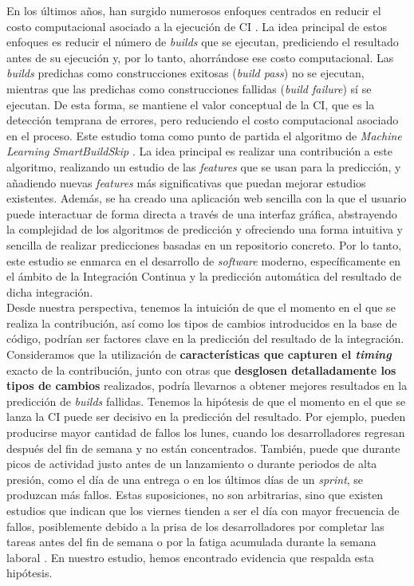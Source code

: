En los últimos años, han surgido numerosos enfoques centrados en reducir el costo computacional
asociado a la ejecución de CI \cite{1,2,4,5,6,7}. La idea principal de estos enfoques es
reducir el número de \textit{builds} que se ejecutan, prediciendo el resultado antes de su
ejecución y, por lo tanto, ahorrándose ese costo computacional. Las \textit{builds} predichas como
construcciones exitosas (\textit{build pass}) no se ejecutan, mientras que las predichas como
construcciones fallidas (\textit{build failure}) sí se ejecutan. De esta forma, se mantiene el
valor conceptual de la CI, que es la detección temprana de errores, pero reduciendo
el costo computacional asociado en el proceso. Este estudio toma como punto de partida el
algoritmo de \textit{Machine Learning} \textit{SmartBuildSkip} \cite{2}. La idea principal es
realizar una contribución a este algoritmo, realizando un estudio de las \textit{features} que
se usan para la predicción, y añadiendo nuevas \textit{features} más significativas que puedan
mejorar estudios existentes. Además, se ha creado una aplicación web sencilla con la que el usuario
puede interactuar de forma directa a través de una interfaz gráfica, abstrayendo la complejidad
de los algoritmos de predicción y ofreciendo una forma intuitiva y sencilla de realizar
predicciones basadas en un repositorio concreto. Por lo tanto, este estudio se enmarca en el
desarrollo de \textit{software} moderno, específicamente en el ámbito de la Integración Continua y
la predicción automática del resultado de dicha integración.\\

Desde nuestra perspectiva, tenemos la intuición de que el momento en el que se realiza la
contribución, así como los tipos de cambios introducidos en la base de código, podrían ser factores
clave en la predicción del resultado de la integración. Consideramos que la utilización de
\textbf{características que capturen el \textit{timing}} exacto de la contribución, junto con
otras que \textbf{desglosen detalladamente los tipos de cambios} realizados, podría llevarnos a
obtener mejores resultados en la predicción de \textit{builds} fallidas. Tenemos la hipótesis de
que el momento en el que se lanza la CI puede ser decisivo en la predicción del resultado. Por
ejemplo, pueden producirse mayor cantidad de fallos los lunes, cuando los desarrolladores regresan
después del fin de semana y no están concentrados. También, puede que durante picos de actividad
justo antes de un lanzamiento o durante periodos de alta presión, como el día de una entrega o en
los últimos días de un \textit{sprint}, se produzcan más fallos. Estas suposiciones, no son
arbitrarias, sino que existen estudios que indican que los viernes tienden a ser el día con mayor
frecuencia de fallos, posiblemente debido a la prisa de los desarrolladores por completar las
tareas antes del fin de semana o por la fatiga acumulada durante la semana laboral \cite{21}. En
nuestro estudio, hemos encontrado evidencia que respalda esta hipótesis.\\

